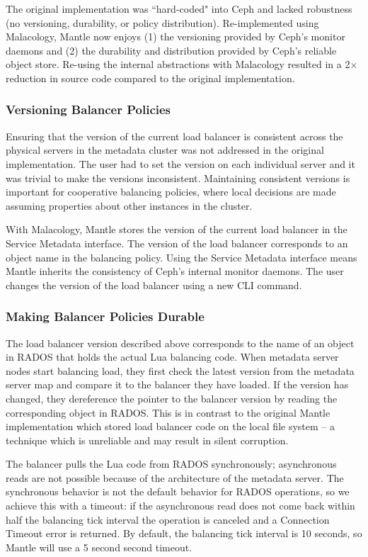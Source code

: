 The original implementation was ``hard-coded" into Ceph and lacked robustness
(no versioning, durability, or policy distribution).  Re-implemented using
Malacology, Mantle now enjoys (1) the versioning provided by Ceph's monitor daemons and (2) the durability and
distribution provided by Ceph's reliable object store.  Re-using the internal
abstractions with Malacology resulted in a 2\(\times\) reduction in source code
compared to the original implementation.

\subsubsection{Versioning Balancer Policies}

Ensuring that the version of the current load balancer is consistent across the
physical servers in the metadata cluster was not addressed in the original
implementation. The user had to set the version on each individual server and
it was trivial to make the versions inconsistent. Maintaining consistent
versions is important for cooperative balancing policies, where
local decisions are made assuming properties about other instances in the cluster.

With Malacology, Mantle stores the version of the current load balancer in the
Service Metadata interface. The version of the load balancer corresponds
to an object name in the balancing policy. Using the Service Metadata interface
means Mantle inherits the consistency of Ceph's internal
monitor daemons. The user changes the version of the load balancer using a new
CLI command.

\subsubsection{Making Balancer Policies Durable}

The load balancer version described above corresponds to the name of an object
in RADOS that holds the actual Lua balancing code.  When metadata server nodes start
balancing load, they first check the latest version from the metadata server map and
compare it to the balancer they have loaded. If the version has changed, they
dereference the pointer to the balancer version by reading the corresponding
object in RADOS. This is in contrast to the original Mantle implementation which stored load
balancer code on the local file system -- a technique which is unreliable and
may result in silent corruption.

The balancer pulls the Lua code from RADOS synchronously; asynchronous reads
are not possible because of the architecture of the metadata server. The synchronous
behavior is not the default behavior for RADOS operations, so we achieve this
with a timeout: if the asynchronous read does not come back within half the
balancing tick interval the operation is canceled and a Connection Timeout
error is returned. By default, the balancing tick interval is 10 seconds, so
Mantle will use a 5 second second timeout.

